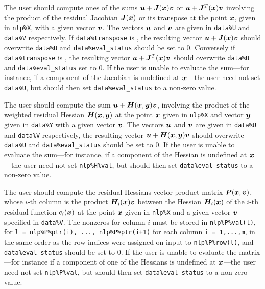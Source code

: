 \documentclass{galahad}
\begin{document}
\begin{description}
 The user should compute ones of the sums ${\bm{u}} + {\bm{J}}({\bm{x}}) {\bm{v}}$
     or ${\bm{u}} + {\bm{J}}^T({\bm{x}}) {\bm{v}}$ involving the product of the residual
     Jacobian ${\bm{J}}({\bm{x}})$ or its transpose at the point ${\bm{x}}$, given
     in {\tt nlp\%X}, with a given vector ${\bm{v}}$.
     The vectors ${\bm{u}}$ and ${\bm{v}}$ are given in {\tt data\%U}
     and {\tt data\%V} respectively.
     If {\tt data\%transpose} is \false, the resulting
     vector ${\bm{u}} + {\bm{J}}({\bm{x}}) {\bm{v}}$ should overwrite {\tt data\%U}
     and  {\tt data\%eval\_status} should be set to 0.
     Conversely if {\tt data\%transpose} is \true, the resulting
     vector ${\bm{u}} + {\bm{J}}^T({\bm{x}}) {\bm{v}}$ should overwrite {\tt data\%U}
     and {\tt data\%eval\_status} set to 0. If the user is
     unable to evaluate the sum---for instance, if a component of the Jacobian
     is undefined at ${\bm{x}}$---the user need not set {\tt data\%U}, but
     should then set {\tt data\%eval\_status} to a non-zero value.

 The user should compute the sum ${\bm{u}} + {\bm{H}}({\bm{x}},{\bm{y}}) {\bm{v}}$,
     involving the product of the weighted residual Hessian ${\bm{H}}({\bm{x}},{\bm{y}})$
     at the point ${\bm{x}}$ given in {\tt nlp\%X} and vector ${\bm{y}}$ given in
     {\tt data\%Y} with a given vector ${\bm{v}}$.
     The vectors ${\bm{u}}$ and ${\bm{v}}$ are given in {\tt data\%U}
     and {\tt data\%V} respectively, the resulting
     vector ${\bm{u}} + {\bm{H}}({\bm{x}},{\bm{y}}) {\bm{v}}$ should overwrite {\tt data\%U}
     and  {\tt data\%eval\_status} should be set to 0. If the user is
     unable to evaluate the sum---for instance, if a component of the Hessian
     is undefined at ${\bm{x}}$---the user need not set {\tt nlp\%H\%val}, but
     should then set {\tt data\%eval\_status} to a non-zero value.

 The user should compute the residual-Hessians-vector-product
     matrix ${\bm{P}}({\bm{x}},{\bm{v}})$, whose $i$-th column is the product
     ${\bm{H}}_i({\bm{x}}){\bm{v}}$ between the Hessian ${\bm{H}}_i({\bm{x}})$ of the $i$-th
     residual function $c_i({\bm{x}})$ at the point ${\bm{x}}$ given in {\tt nlp\%X}
     and a given vector ${\bm{v}}$ specified in {\tt data\%V}.
     The nonzeros for column $i$ must be stored in {\tt nlp\%P\%val(l)}, for
     {\tt l = nlp\%P\%ptr(i), ...,  nlp\%P\%ptr(i+1)} for each column
     {\tt i = 1,...,m}, in the same order as the row indices were assigned
     on input to {\tt nlp\%P\%row(l)},
     and  {\tt data\%eval\_status} should be set to 0.
     If the user is unable to evaluate the matrix---for instance
     if a component of one of the Hessians is
     undefined at ${\bm{x}}$---the user need not set {\tt nlp\%P\%val}, but
     should then set {\tt data\%eval\_status} to a non-zero value.


\end{description}
\end{document}
